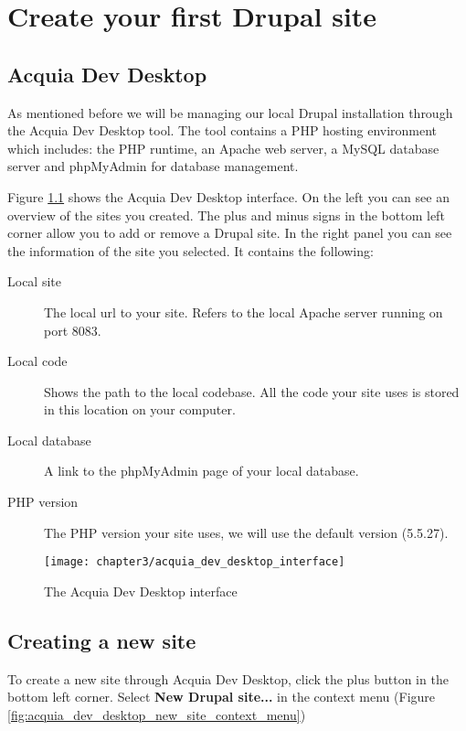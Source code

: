 \chapter{Create your first Drupal site}

\section{Acquia Dev Desktop}

As mentioned before we will be managing our local Drupal installation through the Acquia Dev Desktop tool. The tool contains a PHP hosting environment which includes: the PHP runtime, an Apache web server, a MySQL database server and phpMyAdmin for database management. 

Figure \ref{fig:acquia_dev_desktop_interface} shows the Acquia Dev Desktop interface. On the left you can see an overview of the sites you created. The plus and minus signs in the bottom left corner allow you to add or remove a Drupal site.
In the right panel you can see the information of the site you selected. It contains the following:
\begin{description}
	\item[Local site] The local url to your site. Refers to the local Apache server running on port 8083.
	\item[Local code] Shows the path to the local codebase. All the code your site uses is stored in this location on your computer.
	\item[Local database] A link to the phpMyAdmin page of your local database.
	\item[PHP version] The PHP version your site uses, we will use the default version (5.5.27).
\end{description}


	\begin{figure}[H]
		\centering
		\texttt{[image: chapter3/acquia\_dev\_desktop\_interface]}
		\caption{The Acquia Dev Desktop interface}
		\label{fig:acquia_dev_desktop_interface}
	\end{figure}
	
\section{Creating a new site}

To create a new site through Acquia Dev Desktop, click the plus button in the bottom left corner. Select \textbf{New Drupal site...} in the context menu (Figure \ref{fig:acquia_dev_desktop_new_site_context_menu})

